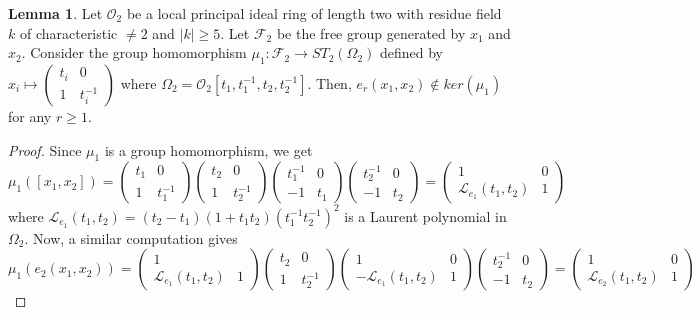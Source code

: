\documentclass[10pt,twoside]{amsart}
\newcommand{\R}{\mathcal{O}_2}
\theoremstyle{definition}
\theoremstyle{definition}
\newtheorem{lemma}[theorem]{Lemma}
\begin{document}
\begin{lemma}{\label{kernel}}
Let $\R$ be a local principal ideal ring of length two with residue field $k$ of characteristic $\neq 2$ and $|k|\geq 5$. Let $\mathcal F_2$ be the free group generated by $x_1$ and $x_2$. Consider the group homomorphism $\mu_1 \colon \mathcal F_2 \rightarrow ST_2(\Omega_2)$ defined by $x_i \mapsto \left( \begin{array}{cc}
 t_i  & 0 \\ 1 & t_i^{-1} \end{array}\right) $ where $\Omega_2 = \R[t_1, t_1^{-1}, t_2, t_2^{-1}]$. Then, $e_r(x_1, x_2) \notin ker(\mu_1)$ for any $r\geq 1$.
\end{lemma}
\begin{proof}
Since $\mu_1$ is a group homomorphism, we get $$\mu_1([x_1, x_2]) = \begin{pmatrix} t_1  & 0 \\ 1 & t_1^{-1} \end{pmatrix} \begin{pmatrix}
 t_2  & 0 \\ 1 & t_2^{-1} \end{pmatrix} \begin{pmatrix} t_1^{-1}  & 0 \\ -1 & t_1 \end{pmatrix} \begin{pmatrix} t_2^{-1}  & 0 \\ -1 & t_2 \end{pmatrix} = \left(\begin{array}{cc} 1  & 0 \\ \mathcal{L}_{e_1}(t_1, t_2) & 1
\end{array} \right)$$ 
where $\mathcal{L}_{e_1}(t_1, t_2) = (t_2 - t_1)(1 + t_1t_2)(t_1^{-1}t_2^{-1})^2$ is a Laurent polynomial in $\Omega_2$. Now, a similar computation gives 
$$\mu_1(e_2(x_1, x_2)) = \begin{pmatrix} 1  & \\ \mathcal{L}_{e_1}(t_1, t_2) & 1 \end{pmatrix} \begin{pmatrix}
 t_2  & 0 \\ 1 & t_2^{-1} \end{pmatrix} \begin{pmatrix} 1  & 0 \\ -\mathcal{L}_{e_1}(t_1, t_2) & 1 \end{pmatrix} \begin{pmatrix} t_2^{-1}  & 0 \\ -1 & t_2 \end{pmatrix} = \left(\begin{array}{cc} 1  & 0 \\   \mathcal{L}_{e_2}(t_1, t_2) & 1 \end{array} \right)$$ 

\end{proof}
\end{document}
